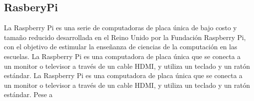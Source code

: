 \subsection{RasberyPi} %
\label{sub:Rasbery}
    La Raspberry Pi es una serie de computadoras de placa \'unica de bajo costo y tama\~no 
        reducido desarrollada en el Reino Unido por la Fundaci\'on Raspberry Pi, con el objetivo de 
        estimular la ense\~nanza de ciencias de la computaci\'on en las escuelas. La Raspberry Pi es 
        una computadora de placa \'unica que se conecta a un monitor o televisor a trav\'es de un cable HDMI, 
        y utiliza un teclado y un rat\'on est\'andar. La Raspberry Pi es una computadora de placa \'unica que 
        se conecta a un monitor o televisor a trav\'es de un cable HDMI, y utiliza un teclado y un rat\'on est\'andar.\cite {RasberyPi}
    \vskip 0.5cm
    Pese a 